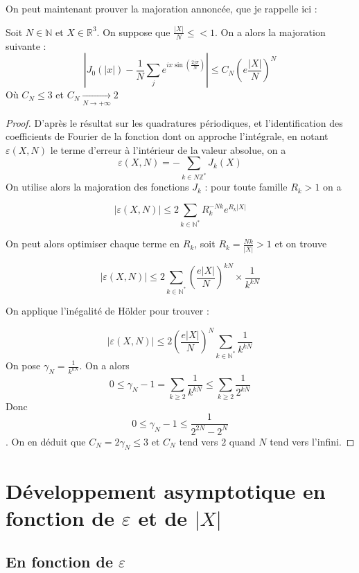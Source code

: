 \documentclass[11pt,a4paper]{article}
\begin{document}
On peut maintenant prouver la majoration annoncée, que je rappelle ici :

\begin{Prop} Soit $N\in \mathbb{N}$ et $X\in \mathbb{R}^3$. On suppose que $\frac{|X|}{N} \leq  < 1$. On a alors la majoration suivante : \[\left| J_0(|x|) - \frac{1}{N}\sum_{j} e^{ix\sin\left(\frac{2j\pi}{N}\right)}\right|\leq C_N \left(e\frac{|X|}{N} \right)^N\] 
Où $C_N \leq 3$ et $C_N \underset{N\to+\infty} {\to}2$

 
\begin{proof}
D'après le résultat sur les quadratures périodiques, et l'identification des coefficients de Fourier de la fonction dont on approche l'intégrale, en notant $\varepsilon(X,N)$ le terme d'erreur à l'intérieur de la valeur absolue, on a \[\varepsilon(X,N) = -\sum_{k\in N\mathbb{Z}^*} J_k(X)\]
On utilise alors la majoration des fonctions $J_k$ : pour toute famille $R_k>1$ on a 

\[|\varepsilon(X,N)| \leq 2\sum_{k\in \mathbb{N}^*} R_k^{-Nk}e^{R_k|X|}\]

On peut alors optimiser chaque terme en $R_k$, soit $R_k = \frac{Nk}{|X|}> 1$ et on trouve 

\[|\varepsilon(X,N)| \leq 2\sum_{k\in \mathbb{N}^*} \left(\frac{e|X|}{N}\right)^{kN} \times \frac{1}{k^{kN}}\]

On applique l'inégalité de Hölder pour trouver : 

\[|\varepsilon(X,N)| \leq 2\left(\frac{e|X|}{N}\right)^{N} \sum_{k\in \mathbb{N}^*}  \frac{1}{k^{kN}} \]
On pose $\gamma_N = \frac{1}{k^{kN}}$. On a alors \[0 \leq \gamma_N - 1 = \sum_{k\geq 2} \frac{1}{k^{kN}}\leq \sum_{k\geq 2} \frac{1}{2^{kN}}\] Donc \[0 \leq \gamma_N - 1 \leq \frac{1}{2^{2N} - 2^N}\]. On en déduit que $C_N = 2\gamma_N \leq 3$ et $C_N$ tend vers $2$ quand $N$ tend vers l'infini. 

\end{proof}
\end{Prop}

\section{Développement asymptotique en fonction de $\varepsilon$ et de $|X|$ }

\subsection{En fonction de $\varepsilon$}
\end{document}
